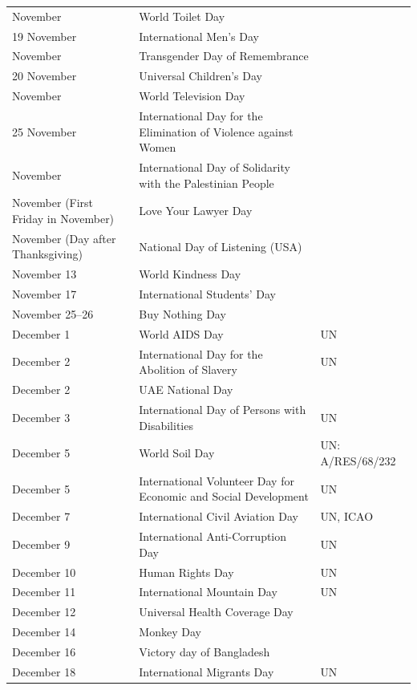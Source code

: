 \documentclass[
  openany]{book}
\begin{document}
\begin{longtable}[t]{>{\raggedright\arraybackslash}p{8em}>{\raggedright\arraybackslash}p{18em}>{\raggedright\arraybackslash}p{10em}}
19 November & World Toilet Day & \\
\rowcolor{gray!6}  19 November & International Men's Day & \\
20 November & Transgender Day of Remembrance & \\
\rowcolor{gray!6}  20 November & Universal Children's Day & \\
\addlinespace
21 November & World Television Day & \\
\rowcolor{gray!6}  25 November & International Day for the Elimination of Violence against Women & \\
29 November & International Day of Solidarity with the Palestinian People & \\
\rowcolor{gray!6}  November (First Friday in November) & Love Your Lawyer Day & \\
November (Day after Thanksgiving) & National Day of Listening (USA) & \\
\addlinespace
\rowcolor{gray!6}  November 13 & World Kindness Day & \\
November 17 & International Students' Day & \\
\rowcolor{gray!6}  November 25–26 & Buy Nothing Day & \\
December 1 & World AIDS Day & UN\\
\rowcolor{gray!6}  December 2 & International Day for the Abolition of Slavery & UN\\
\addlinespace
December 2 & UAE National Day & \\
\rowcolor{gray!6}  December 3 & International Day of Persons with Disabilities & UN\\
December 5 & World Soil Day & UN: A/RES/68/232\\
\rowcolor{gray!6}  December 5 & International Volunteer Day for Economic and Social Development & UN\\
December 7 & International Civil Aviation Day & UN, ICAO\\
\addlinespace
\rowcolor{gray!6}  December 9 & International Anti-Corruption Day & UN\\
December 10 & Human Rights Day & UN\\
\rowcolor{gray!6}  December 11 & International Mountain Day & UN\\
December 12 & Universal Health Coverage Day & \\
\rowcolor{gray!6}  December 14 & Monkey Day & \\
\addlinespace
December 16 & Victory day of Bangladesh & \\
\rowcolor{gray!6}  December 18 & International Migrants Day & UN\\

\end{longtable}
\end{document}
